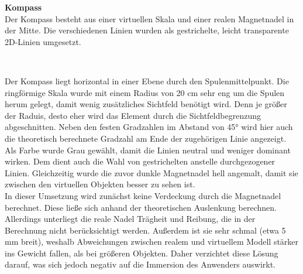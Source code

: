 \textbf{Kompass}\\
Der Kompass besteht aus einer virtuellen Skala und einer realen Magnetnadel in der Mitte. Die verschiedenen Linien wurden als gestrichelte, leicht transparente 2D-Linien umgesetzt.
\vspace{4px}
\begin{center}
	\\
\end{center}
\vspace{6px}

Der Kompass liegt horizontal in einer Ebene durch den Spulenmittelpunkt. Die ringförmige Skala wurde mit einem Radius von 20 cm sehr eng um die Spulen herum gelegt, damit wenig zusätzliches Sichtfeld benötigt wird. Denn je größer der Raduis, desto eher wird das Element durch die Sichtfeldbegrenzung abgeschnitten. Neben den festen Gradzahlen im Abstand von 45° wird hier auch die theoretisch berechnete Gradzahl am Ende der zugehörigen Linie angezeigt.\\

Als Farbe wurde Grau gewählt, damit die Linien neutral und weniger dominant wirken. Dem dient auch die Wahl von gestrichelten anstelle durchgezogener Linien. Gleichzeitig wurde die zuvor dunkle Magnetnadel hell angemalt, damit sie zwischen den virtuellen Objekten besser zu sehen ist.\\

In dieser Umsetzung wird zunächst keine Verdeckung durch die Magnetnadel berechnet. Diese ließe sich anhand der theoretischen Auslenkung berechnen. Allerdings unterliegt die reale Nadel Trägheit und Reibung, die in der Berechnung nicht berücksichtigt werden. Außerdem ist sie sehr schmal (etwa 5 mm breit), weshalb Abweichungen zwischen realem und virtuellem Modell stärker ins Gewicht fallen, als bei größeren Objekten. Daher verzichtet diese Lösung darauf, was sich jedoch negativ auf die Immersion des Anwenders auswirkt.\\

